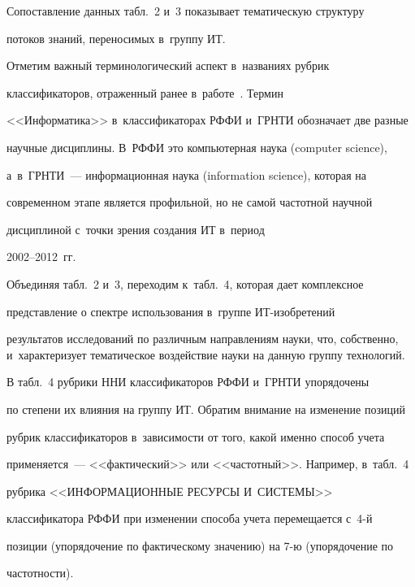      


     Сопоставление данных табл.~2 и~3 показывает тематическую структуру 


потоков знаний, переносимых в~группу ИТ.


     


     Отметим важный терминологический аспект в~названиях рубрик 


классификаторов, отраженный ранее в~работе~\cite{1-mins}. Термин 


<<Информатика>> в~классификаторах РФФИ и~ГРНТИ обозначает две разные 


научные дисциплины. В~РФФИ это компьютерная наука (computer science), 


а~в~ГРНТИ~--- информационная наука (information science), которая на 


современном этапе является профильной, но не самой частотной научной 


дисциплиной с~точки зрения создания ИТ в~период 


2002--2012~гг.


     


     Объединяя табл.~2 и~3, переходим к~табл.~4, которая дает комплексное 


представление о спектре использования в~группе ИТ-изоб\-ре\-те\-ний 


результатов исследований по различным направлениям науки, что, собственно, и~характеризует тематическое воздействие науки на данную группу технологий.


     


     В табл.~4 рубрики ННИ классификаторов РФФИ и~ГРНТИ упорядочены 


по степени их влияния на группу ИТ. Обратим внимание на изменение позиций 


рубрик классификаторов в~зависимости от того, какой именно способ учета 


применяется~--- <<фактический>> или <<частотный>>. Например, в~табл.~4 


рубрика <<ИНФОРМАЦИОННЫЕ РЕСУРСЫ И~СИСТЕМЫ>> 


классификатора \mbox{РФФИ} при изменении способа учета перемещается с~4-й 


позиции (упорядочение по фактическому значению) на 7-ю (упорядочение по 


частотности). 








